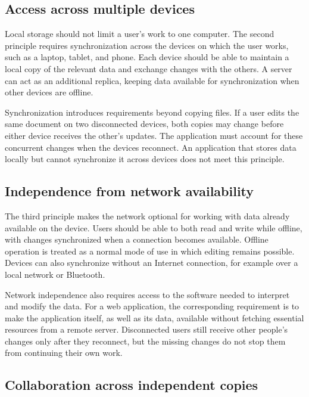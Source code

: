 \subsection{Access across multiple devices}

Local storage should not limit a user's work to one computer.
The second principle requires synchronization across the devices on which the user works, such as a laptop, tablet, and phone.
Each device should be able to maintain a local copy of the relevant data and exchange changes with the others.
A server can act as an additional replica, keeping data available for synchronization when other devices are offline.
\parencite{local-first-software}

Synchronization introduces requirements beyond copying files.
If a user edits the same document on two disconnected devices, both copies may change before either device receives the other's updates.
The application must account for these concurrent changes when the devices reconnect.
An application that stores data locally but cannot synchronize it across devices does not meet this principle.

\subsection{Independence from network availability}

The third principle makes the network optional for working with data already available on the device.
Users should be able to both read and write while offline, with changes synchronized when a connection becomes available.
Offline operation is treated as a normal mode of use in which editing remains possible.
Devices can also synchronize without an Internet connection, for example over a local network or Bluetooth.
\parencite{local-first-software}

Network independence also requires access to the software needed to interpret and modify the data.
For a web application, the corresponding requirement is to make the application itself, as well as its data, available without fetching essential resources from a remote server.
Disconnected users still receive other people's changes only after they reconnect, but the missing changes do not stop them from continuing their own work.

\subsection{Collaboration across independent copies}


